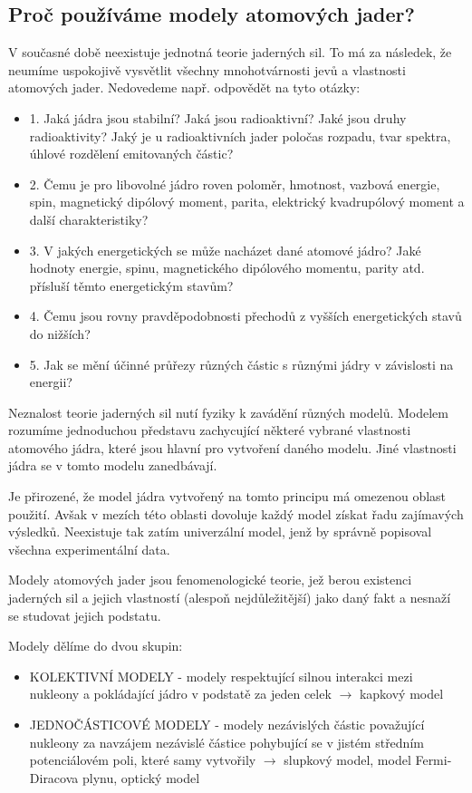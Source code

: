 \documentclass[../../main.tex]{subfiles}
\begin{document}
\subsection{Proč používáme modely atomových jader?}

V současné době neexistuje jednotná teorie jaderných sil. To má za následek, že neumíme uspokojivě vysvětlit všechny mnohotvárnosti jevů a vlastnosti atomových jader. Nedovedeme např. odpovědět na tyto otázky:
\begin{itemize}
	\item 1. Jaká jádra jsou stabilní? Jaká jsou radioaktivní? Jaké jsou druhy radioaktivity? Jaký je u radioaktivních jader poločas rozpadu, tvar spektra, úhlové rozdělení emitovaných částic?
	
	\item 2. Čemu je pro libovolné jádro roven poloměr, hmotnost, vazbová energie, spin, magnetický dipólový moment, parita, elektrický kvadrupólový moment a další charakteristiky?
	
	\item 3. V jakých energetických se může nacházet dané atomové jádro? Jaké hodnoty energie, spinu, magnetického dipólového momentu, parity atd. přísluší těmto energetickým stavům?
	
	\item 4. Čemu jsou rovny pravděpodobnosti přechodů z vyšších energetických stavů do nižších?
	
	\item 5. Jak se mění účinné průřezy různých částic s různými jádry v závislosti na energii?
\end{itemize}

Neznalost teorie jaderných sil nutí fyziky k zavádění různých modelů. Modelem rozumíme jednoduchou představu zachycující některé vybrané vlastnosti atomového jádra, které jsou hlavní pro vytvoření daného modelu. Jiné vlastnosti jádra se v tomto modelu zanedbávají. 

Je přirozené, že model jádra vytvořený na tomto principu má omezenou oblast použití. Avšak v mezích této oblasti dovoluje každý model získat řadu zajímavých výsledků. Neexistuje tak zatím univerzální model, jenž by správně popisoval všechna experimentální data. 

Modely atomových jader jsou fenomenologické teorie, jež berou existenci jaderných sil a jejich vlastností (alespoň nejdůležitější) jako daný fakt a nesnaží se studovat jejich podstatu.

Modely dělíme do dvou skupin:
\begin{itemize}
	\item KOLEKTIVNÍ MODELY - modely respektující silnou interakci mezi nukleony a pokládající jádro v podstatě za jeden celek $\rightarrow$ kapkový model
	
	\item JEDNOČÁSTICOVÉ MODELY - modely nezávislých částic považující nukleony za navzájem nezávislé částice pohybující se v jistém středním potenciálovém poli, které samy vytvořily $\rightarrow$ slupkový model, model Fermi-Diracova plynu, optický model
\end{itemize}
\end{document}
